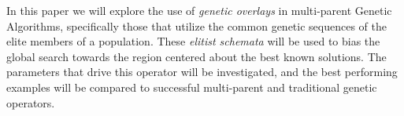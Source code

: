 In this paper we will explore the use of \emph{genetic overlays} in multi-parent Genetic Algorithms, specifically those that utilize the common genetic sequences of the elite members of a population. These \emph{elitist schemata} will be used to bias the global search towards the region centered about the best known solutions. The parameters that drive this operator will be investigated, and the best performing examples will be compared to successful multi-parent and traditional genetic operators.
